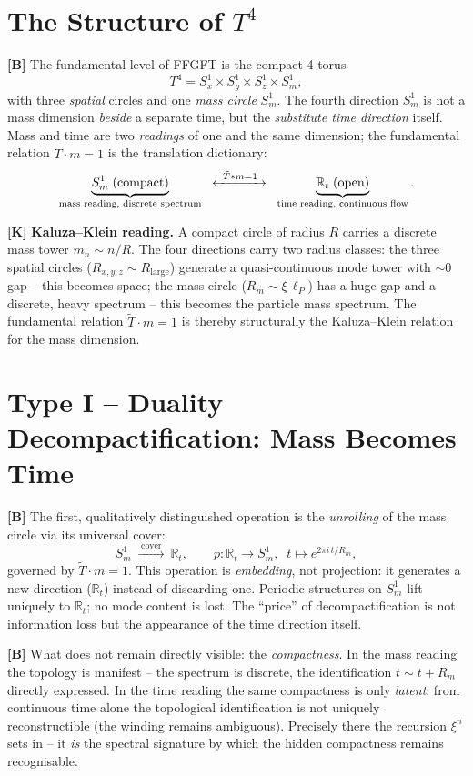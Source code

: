 \section{The Structure of $T^4$}

\textbf{[B]} The fundamental level of FFGFT is the compact 4-torus
\[
  T^4 = S^1_x\times S^1_y\times S^1_z\times S^1_m,
\]
with three \emph{spatial} circles and one \emph{mass circle} $S^1_m$. The
fourth direction $S^1_m$ is not a mass dimension \emph{beside} a separate time,
but the \emph{substitute time direction} itself. Mass and time are two
\emph{readings} of one and the same dimension; the fundamental relation
$\tilde T\cdot m=1$ is the translation dictionary:
\[
  \underbrace{S^1_m\;\text{(compact)}}_{\text{mass reading, discrete spectrum}}
  \;\;\xleftrightarrow{\;\;\tilde T\cdot m=1\;\;}\;\;
  \underbrace{\mathbb{R}_t\;\text{(open)}}_{\text{time reading, continuous flow}}.
\]

\textbf{[K]} \textbf{Kaluza--Klein reading.} A compact circle of radius $R$
carries a discrete mass tower $m_n\sim n/R$. The four directions carry two radius
classes: the three spatial circles ($R_{x,y,z}\sim R_\text{large}$) generate a
quasi-continuous mode tower with $\sim0$ gap -- this becomes space; the mass
circle ($R_m\sim\xi\,\ell_P$) has a huge gap and a discrete, heavy spectrum --
this becomes the particle mass spectrum. The fundamental relation $\tilde T\cdot m=1$
is thereby structurally the Kaluza--Klein relation for the mass dimension.

\section{Type I -- Duality Decompactification: Mass Becomes Time}

\textbf{[B]} The first, qualitatively distinguished operation is the \emph{unrolling}
of the mass circle via its universal cover:
\[
  S^1_m\;\xrightarrow{\;\text{cover}\;}\ \mathbb{R}_t,
  \qquad p:\mathbb{R}_t\to S^1_m,\;\;t\mapsto e^{2\pi i\,t/R_m},
\]
governed by $\tilde T\cdot m=1$. This operation is \emph{embedding}, not
projection: it generates a new direction ($\mathbb{R}_t$) instead of discarding
one. Periodic structures on $S^1_m$ lift uniquely to $\mathbb{R}_t$; no mode
content is lost. The ``price'' of decompactification is not information loss but
the appearance of the time direction itself.

\textbf{[B]} What does not remain directly visible: the \emph{compactness}. In
the mass reading the topology is manifest -- the spectrum is discrete, the
identification $t\sim t+R_m$ directly expressed. In the time reading the same
compactness is only \emph{latent}: from continuous time alone the topological
identification is not uniquely reconstructible (the winding remains ambiguous).
Precisely there the recursion $\xi^n$ sets in -- it \emph{is} the spectral
signature by which the hidden compactness remains recognisable.


